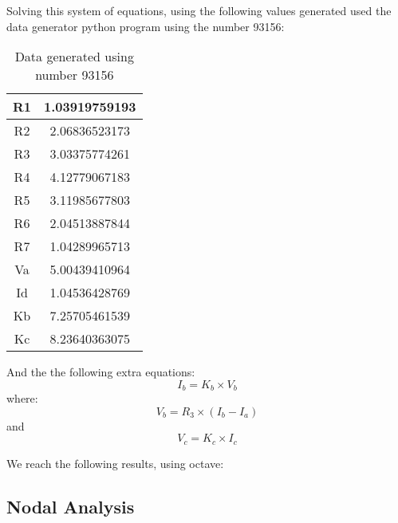 Solving this system of equations, using the following values generated used the data generator python program using the number 93156:


\begin{table}[h]
  \centering
  \begin{tabular}{ c c }
    R1 & 1.03919759193 \\ 
    \hline
    R2 & 2.06836523173 \\ 
    \hline
    R3 & 3.03375774261 \\ 
    \hline
    R4 & 4.12779067183 \\ 
    \hline
    R5 & 3.11985677803 \\ 
    \hline
    R6 & 2.04513887844 \\ 
    \hline
    R7 & 1.04289965713 \\ 
    \hline
    Va & 5.00439410964 \\ 
    \hline
    Id & 1.04536428769 \\ 
    \hline
    Kb & 7.25705461539 \\ 
    \hline
    Kc & 8.23640363075 \\ 
  \end{tabular}
  \caption{Data generated using number 93156}
  \label{tab:data}
\end{table}


And the the following extra equations:
\begin{equation}
  I_b=K_b \times V_b
  \label{eq:extra1}
\end{equation}
where:
\begin{equation}
  V_b= R_3 \times (I_b-I_a)
  \label{eq:extra1}
\end{equation}
and
\begin{equation}
  V_c=K_c \times I_c
  \label{eq:extra2}
\end{equation}





We reach the following results, using octave:


\subsection{Nodal Analysis}


